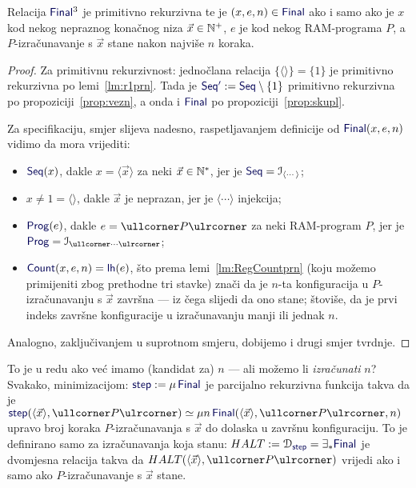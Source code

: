 \begin{lema}[{name=[primitivna rekurzivnost završnosti konfiguracije]}]\label{lm:Finalspec}
Relacija $\f{Final}^3$ je primitivno rekurzivna te je $(x,e,n)\in\f{Final}$ ako i samo ako je $x$ kod nekog nepraznog konačnog niza $\vec x\in{\mathbb N}^+$\!, $e$ je kod nekog RAM-programa $P$, a $P$-izračunavanje s $\vec x$ stane nakon najviše $n$ koraka.
\end{lema}
\begin{proof}
    Za primitivnu rekurzivnost: jednočlana relacija $\{\langle\rangle\}=\{1\}$ je primitivno rekurzivna po lemi~\ref{lm:r1prn}. Tada je $\f{Seq'}:=\f{Seq}\setminus\{1\}$ primitivno rekurzivna po propoziciji~\ref{prop:vezn}, a onda i $\f{Final}$ po propoziciji~\ref{prop:skupl}.

Za specifikaciju, smjer slijeva nadesno, raspetljavanjem definicije od $\f{Final}(x,e,n)$ vidimo da mora vrijediti:
\begin{itemize}
    \item $\f{Seq}(x)$, dakle $x=\langle\vec x\rangle$ za neki $\vec x\in{\mathbb N}^*$, jer je $\f{Seq}=\im{\langle\cdots\rangle}$;
    \item $x\ne1=\langle\rangle$, dakle $\vec x$ je neprazan, jer je $\langle\cdots\rangle$ injekcija;
    \item $\f{Prog}(e)$, dakle $e=\kprog{P}$ za neki RAM-program $P$, jer je $\f{Prog}=\im{\kprog{\cdots}}$;
    \item $\f{Count}(x,e,n)\eq\f{lh}(e)$, što prema lemi~\ref{lm:RegCountprn} (koju možemo primijeniti zbog prethodne tri stavke) znači da je $n$-ta konfiguracija u $P$-izračunavanju s $\vec x$ završna --- iz čega slijedi da ono stane; štoviše, da je prvi indeks završne konfiguracije u izračunavanju manji ili jednak $n$.
\end{itemize}
Analogno, zaključivanjem u suprotnom smjeru, dobijemo i drugi smjer tvrdnje.
\end{proof}

To je u redu ako već imamo (kandidat za) $n$ --- ali možemo li \emph{izračunati} $n$? Svakako, minimizacijom: $\f{step}:=\mu\,\f{Final}$ je parcijalno rekurzivna funkcija takva da je $\f{step}(\langle\vec x\rangle,\kprog P)\simeq\mu n\,\f{Final}(\langle\vec x\rangle,\kprog{P},n)$ upravo broj koraka $P$-izračunavanja s $\vec x$ do dolaska u završnu konfiguraciju. To je definirano samo za izračunavanja koja stanu: $HALT:=\dom{\f{step}}=\exists_*\f{Final}$ je dvomjesna relacija takva da $HALT(\langle \vec x\rangle,\kprog P)$ vrijedi ako i samo ako $P$-izračunavanje s $\vec x$ stane.

